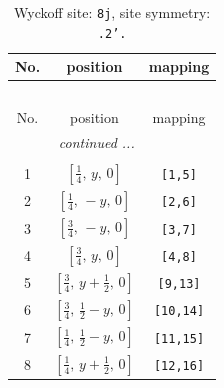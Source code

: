 \documentclass[fleqn,8pt]{jsarticle}
\begin{document}
\begin{longtable}{ccc}
\caption{Wyckoff site: {\tt 8j}, site symmetry: {\tt .2'.}}
 \\
 \hline \hline
No. & position & mapping \\ \hline \endfirsthead

\multicolumn{2}{l}{\tablename\ \thetable{}} \\
 \hline \hline
No. & position & mapping \\ \hline \endhead

 \hline \hline
\multicolumn{2}{r}{\footnotesize\it continued ...} \\ \endfoot

 \hline \hline
\multicolumn{2}{r}{} \\ \endlastfoot

1 & $\left[ \frac{1}{4},\, y,\, 0 \right]$ & {\tt [1,5]} \\ \hline
2 & $\left[ \frac{1}{4},\, - y,\, 0 \right]$ & {\tt [2,6]} \\ \hline
3 & $\left[ \frac{3}{4},\, - y,\, 0 \right]$ & {\tt [3,7]} \\ \hline
4 & $\left[ \frac{3}{4},\, y,\, 0 \right]$ & {\tt [4,8]} \\ \hline
5 & $\left[ \frac{3}{4},\, y + \frac{1}{2},\, 0 \right]$ & {\tt [9,13]} \\ \hline
6 & $\left[ \frac{3}{4},\, \frac{1}{2} - y,\, 0 \right]$ & {\tt [10,14]} \\ \hline
7 & $\left[ \frac{1}{4},\, \frac{1}{2} - y,\, 0 \right]$ & {\tt [11,15]} \\ \hline
8 & $\left[ \frac{1}{4},\, y + \frac{1}{2},\, 0 \right]$ & {\tt [12,16]} \\
\end{longtable}
\renewcommand{\arraystretch}{1.2}
\end{document}
